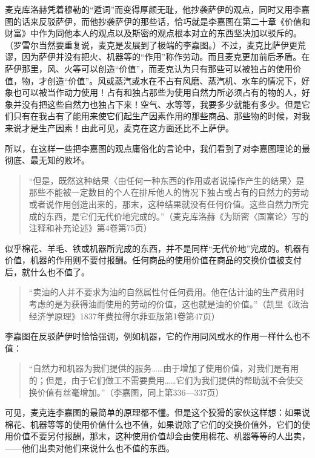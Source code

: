 麦克库洛赫凭着穆勒的“遁词”而变得厚颜无耻，他抄袭萨伊的观点，同时又用李嘉图的话来反驳萨伊，而他抄袭萨伊的那些话，恰巧就是李嘉图在第二十章《价值和财富》中作为同他本人的观点以及斯密的观点根本对立的东西坚决加以驳斥的。（罗雪尔当然要重复说，麦克是发展到了极端的李嘉图。）不过，麦克比萨伊更荒谬，因为萨伊并没有把火、机器等的“作用”称作劳动。而且麦克更加前后矛盾。在萨伊那里，风、火等可以创造“价值”，而麦克认为只有那些可以被独占的使用价值，物，才创造“价值”。风或蒸汽或水在不占有风磨、蒸汽机、水车的情况下，好象也可以被当作动力使用！占有和独占那些为使用自然力所必须占有的物的人，好象并没有把这些自然力也独占下来！空气、水等等，我要多少就能有多少。但是它们只有在我占有了能用来使它们起生产因素作用的那些商品、那些物的时候，对我来说才是生产因素！由此可见，麦克在这方面还比不上萨伊。

所以，在这样一些把李嘉图的观点庸俗化的言论中，我们看到了对李嘉图理论的最彻底、最无知的败坏。

\begin{quote}{“但是，既然这种结果〈由任何一种东西的作用或者说操作产生的结果〉是那些不能被一定数目的个人在排斥他人的情况下独占或占有的自然力的劳动或者说作用创造出来的，那末，这种结果就没有任何价值。这些自然力所完成的东西，是它们无代价地完成的。”（麦克库洛赫《为斯密〈国富论〉写的注释和补充论述》第4卷第75页）}\end{quote}

似乎棉花、羊毛、铁或机器所完成的东西，并不是同样“无代价地”完成的。机器有价值，机器的作用则不要付报酬。任何商品的使用价值在商品的交换价值被支付后，就什么也不值了。

\begin{quote}{“卖油的人并不要求为油的自然属性付任何费用。他在估计油的生产费用时考虑的是为获得油而使用的劳动的价值，这也就是油的价值。”（凯里《政治经济学原理》1837年费拉得尔菲亚版第1卷第47页）}\end{quote}

李嘉图在反驳萨伊时恰恰强调，例如机器，它的作用同风或水的作用一样什么也不值：

\begin{quote}{“自然力和机器为我们提供的服务……由于增加了使用价值，对我们是有用的；但是，由于它们做工不需要费用……它们为我们提供的帮助就不会使交换价值有丝毫增加。”（李嘉图，同上第336—337页）}\end{quote}

可见，麦克连李嘉图的最简单的原理都不懂。但是这个狡猾的家伙这样想：如果说棉花、机器等等的使用价值什么也不值，如果说除了它们的交换价值外，它们的使用价值不要另付报酬，那末，这种使用价值却会由使用棉花、机器等等的人出卖，——他们出卖对他们来说什么也不值的东西。

